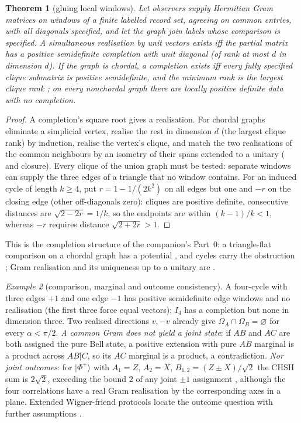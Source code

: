 \documentclass[aps,pra,onecolumn,superscriptaddress,nofootinbib,10pt]{revtex4-2}
\newtheorem{theorem}{Theorem}
\theoremstyle{definition}
\theoremstyle{remark}
\newtheorem{example}[theorem]{Example}
\begin{document}
\begin{theorem}[gluing local windows]\label{thm:fmglue}
Let observers supply Hermitian Gram matrices on windows of a finite labelled record set, agreeing on
common entries, with all diagonals specified, and let the graph join labels whose comparison is
specified.  A simultaneous realisation by unit vectors exists iff the partial matrix has a positive
semidefinite completion with unit diagonal (of rank at most $d$ in dimension $d$).  If the graph is chordal, a
completion exists iff every fully specified clique submatrix is positive semidefinite, and the minimum
rank is the largest clique rank \cite{n2-dirac,n2-grone}; on every nonchordal graph there are locally
positive definite data with no completion.
\end{theorem}
\begin{proof}
A completion's square root gives a realisation.  For chordal graphs eliminate a simplicial vertex,
realise the rest in dimension $d$ (the largest clique rank) by induction, realise the vertex's clique, and
match the two realisations of the common neighbours by an isometry of their spans extended to a unitary
(\cite[Thm.~7]{n2-grone} and closure).  Every clique of the union graph must be tested: separate windows can
supply the three edges of a triangle that no window contains.  For an induced cycle of length $k\ge4$, put
$r=1-1/(2k^2)$ on all edges but one and $-r$ on the closing edge (other off-diagonals zero): cliques are positive
definite, consecutive distances are $\sqrt{2-2r}=1/k$, so the endpoints are within $(k-1)/k<1$, whereas $-r$ requires distance
$\sqrt{2+2r}>1$.
\end{proof}
\noindent This is the completion structure of the companion's Part~0: a triangle-flat comparison on a chordal
graph has a potential \cite[Thm.~0.12, Prop.~0.18]{PaperI}, and cycles carry the obstruction
\cite[Sec.~0.4]{PaperI}; Gram realisation and its uniqueness up to a unitary are
\cite[Props.~0.24, 0.25]{PaperI}.

\begin{example}[comparison, marginal and outcome consistency]\label{ex:fmoutcomes}
A four-cycle with three edges $+1$ and one edge $-1$ has positive semidefinite edge windows and no realisation
(the first three force equal vectors); $I_4$ has a completion but none in dimension three.  Two realised
directions $v,-v$ already give $\Omega_A\cap\Omega_B=\varnothing$ for every $\alpha<\pi/2$.  \emph{A common Gram does not yield a joint state}: if $AB$
and $AC$ are both assigned the pure Bell state, a positive extension with pure $AB$ marginal is a product
across $AB|C$, so its $AC$ marginal is a product, a contradiction.  \emph{Nor joint outcomes}: for $\lvert\Phi^+\rangle$ with
$A_1=Z$, $A_2=X$, $B_{1,2}=(Z\pm X)/\sqrt2$ the CHSH sum is $2\sqrt2$, exceeding the bound $2$ of any joint $\pm1$ assignment
\cite{n2-chsh}, although the four correlations have a real Gram realisation by the corresponding
axes in a plane.  Extended Wigner-friend protocols locate the outcome question with further assumptions
\cite{n2-brukner,n3:Bong}.
\end{example}
\end{document}
